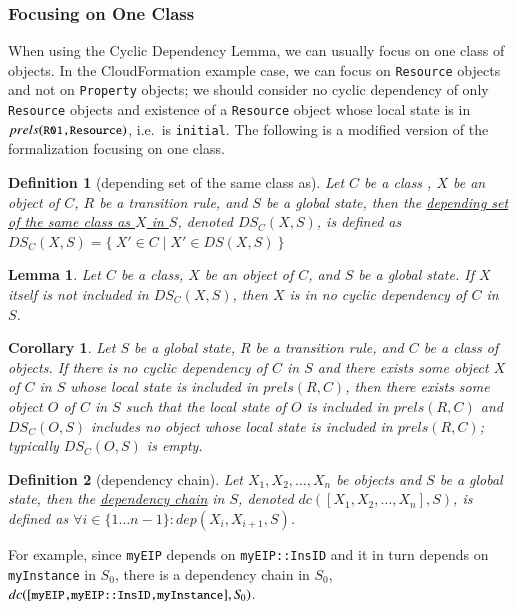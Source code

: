 \documentclass[12pt]{report}
\newtheorem{lemma}{Lemma}
\newtheorem{corollary}{Corollary}
\newtheorem{definition}{Definition}
\newcommand{\mbstt}[1]{\mbox{\small{\tt {#1}}}}
\newcommand{\ul}{\underline}
\begin{document}
\subsubsection{Focusing on One Class}
When using the Cyclic Dependency Lemma, we can usually focus on one
class of objects. In the CloudFormation example case, we can focus on
{\tt Resource} objects and not on {\tt Property} objects; we should
consider no cyclic dependency of only {\tt Resource} objects and
existence of a {\tt Resource} object whose local state is in
$prels(\mbstt{R01,Resource})$, i.e.\ is {\tt initial}. The following
is a modified version of the formalization focusing on one class.

\begin{definition}[depending set of the same class as]
Let $C$ be a class , $X$ be an object of $C$, $R$ be a transition
rule, and $S$ be a global state, then the \ul{depending set of the same
class as $X$ in $S$}, denoted \ul{$DS\!_C(X,S)$}, is defined
as $DS\!_C(X,S)=\{~X'\in C\mid X'\in DS(X,S)~\}$
\end{definition}
\begin{lemma}
Let $C$ be a class, $X$ be an object of $C$, and $S$ be a global
state. If $X$ itself is not included in $DS\!_C(X,S)$, then $X$ is in no
cyclic dependency of $C$ in $S$.
\end{lemma}
\begin{corollary}
Let $S$ be a global state, $R$ be a transition rule, and $C$ be a
class of objects. If there is no cyclic dependency of $C$ in $S$ and
there exists some object $X$ of $C$ in $S$ whose local state is
included in $prels(R,C)$, then there exists some object $O$ of $C$ in
$S$ such that the local state of $O$ is included in $prels(R,C)$ and
$DS\!_C(O,S)$ includes no object whose local state is included in
$prels(R,C)$; typically $DS\!_C(O,S)$ is empty.
\end{corollary}
\begin{definition}[dependency chain]
Let $X_1, X_2, \dots,X_n$ be objects and $S$ be a global state, then the
\ul{dependency chain} in $S$, denoted \ul{$dc([X_1, X_2,\dots,
    X_n],S)$}, is defined as $\forall i \in \{1 \dots n-1\} : dep(X_i,
X_{i+1},S)$.
\end{definition}
For example, since {\tt myEIP} depends on {\tt myEIP::InsID} and it in
turn depends on {\tt myInstance} in $S\!_0$, there is a dependency chain
in $S\!_0$, $dc([\mbstt{myEIP,myEIP::InsID,myInstance}],S\!_0)$.
\end{document}
